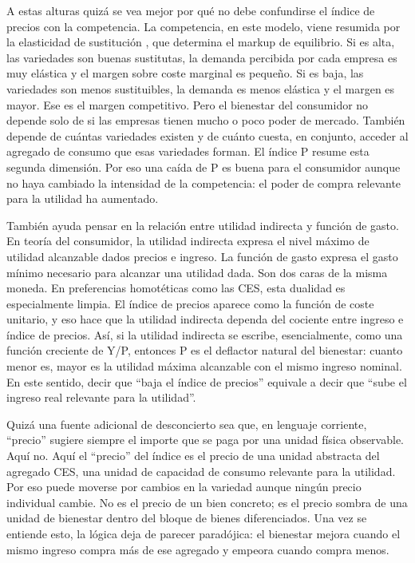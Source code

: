 \documentclass[10pt,a4paper]{article}
\begin{document}
A estas alturas quizá se vea mejor por qué no debe confundirse el índice de precios con la competencia. La competencia, en este modelo, viene resumida por la elasticidad de sustitución \sigma, que determina el markup de equilibrio. Si \sigma es alta, las variedades son buenas sustitutas, la demanda percibida por cada empresa es muy elástica y el margen sobre coste marginal es pequeño. Si \sigma es baja, las variedades son menos sustituibles, la demanda es menos elástica y el margen es mayor. Ese es el margen competitivo. Pero el bienestar del consumidor no depende solo de si las empresas tienen mucho o poco poder de mercado. También depende de cuántas variedades existen y de cuánto cuesta, en conjunto, acceder al agregado de consumo que esas variedades forman. El índice P resume esta segunda dimensión. Por eso una caída de P es buena para el consumidor aunque no haya cambiado la intensidad de la competencia: el poder de compra relevante para la utilidad ha aumentado.

También ayuda pensar en la relación entre utilidad indirecta y función de gasto. En teoría del consumidor, la utilidad indirecta expresa el nivel máximo de utilidad alcanzable dados precios e ingreso. La función de gasto expresa el gasto mínimo necesario para alcanzar una utilidad dada. Son dos caras de la misma moneda. En preferencias homotéticas como las CES, esta dualidad es especialmente limpia. El índice de precios aparece como la función de coste unitario, y eso hace que la utilidad indirecta dependa del cociente entre ingreso e índice de precios. Así, si la utilidad indirecta se escribe, esencialmente, como una función creciente de Y/P, entonces P es el deflactor natural del bienestar: cuanto menor es, mayor es la utilidad máxima alcanzable con el mismo ingreso nominal. En este sentido, decir que “baja el índice de precios” equivale a decir que “sube el ingreso real relevante para la utilidad”.

Quizá una fuente adicional de desconcierto sea que, en lenguaje corriente, “precio” sugiere siempre el importe que se paga por una unidad física observable. Aquí no. Aquí el “precio” del índice es el precio de una unidad abstracta del agregado CES, una unidad de capacidad de consumo relevante para la utilidad. Por eso puede moverse por cambios en la variedad aunque ningún precio individual cambie. No es el precio de un bien concreto; es el precio sombra de una unidad de bienestar dentro del bloque de bienes diferenciados. Una vez se entiende esto, la lógica deja de parecer paradójica: el bienestar mejora cuando el mismo ingreso compra más de ese agregado y empeora cuando compra menos.
\end{document}
